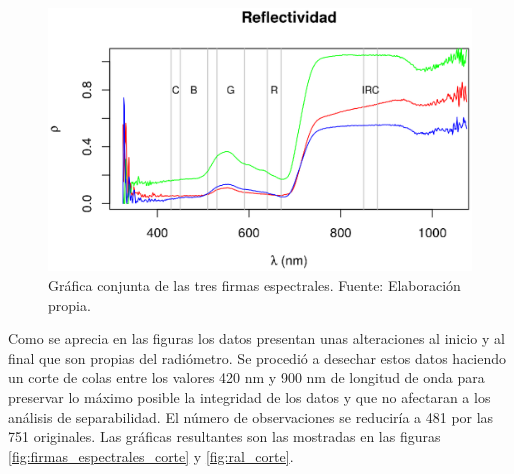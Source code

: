 \begin{figure}
	\centering
	\includegraphics[width=0.8\linewidth]{./Imagenes/ral.eps}
	\caption[Firmas espectrales de las tres especies]{Gráfica conjunta de las tres firmas espectrales. Fuente: Elaboración propia.}
	\label{fig:ral}
\end{figure}

Como se aprecia en las figuras los datos presentan unas alteraciones al inicio y al final que son propias del radiómetro. Se procedió a desechar estos datos haciendo un corte de colas entre los valores 420 nm y 900 nm de longitud de onda para preservar lo máximo posible la integridad de los datos y que no afectaran a los análisis de separabilidad. El número de observaciones se reduciría a 481 por las 751 originales. Las gráficas resultantes son las mostradas en las figuras \ref{fig:firmas_espectrales_corte} y \ref{fig:ral_corte}.\Sep

